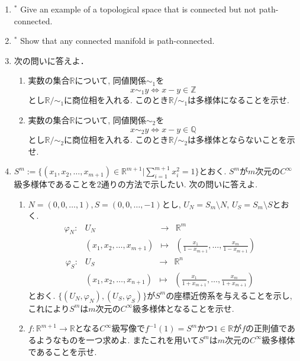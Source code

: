 \documentclass[dvipdfmx,a4paper,11pt]{article}
\newcommand{\R}{\mathbb{R}}
\newcommand{\Z}{\mathbb{Z}}
\newcommand{\Q}{\mathbb{Q}}
\theoremstyle{definition}
\begin{document}
\begin{enumerate}[label=\textbf{問}1.\arabic*]
	\item $^{*}$ Give an example of a topological space that is connected but not path-connected. %
	\item $^{*}$ Show that any connected manifold is path-connected. %
\item 次の問いに答えよ．
	\begin{enumerate}
	\item 実数の集合$\R$について, 同値関係$\sim_{1}$を
	$$
	x \sim_{1} y \Leftrightarrow x - y \in \Z
	$$
	とし$\R / \sim_{1}$に商位相を入れる. このとき$\R / \sim_{1}$は多様体になることを示せ.
	\item 実数の集合$\R$について, 同値関係$\sim_{2}$を
	$$
	x \sim_{2} y \Leftrightarrow x - y \in \Q
	$$
	とし$\R / \sim_{2}$に商位相を入れる.  このとき$\R / \sim_{2}$は多様体とならないことを示せ.
	\end{enumerate}
	
\item \label{sphere} $S^{m} := \{ (x_1, x_2, \ldots, x_{m+1}) \in \R^{m+1}| \sum_{i=1}^{m+1} x_{i}^{2} = 1 \}$とおく. $S^{m}$が$m$次元の$C^{\infty}$級多様体であることを2通りの方法で示したい. 次の問いに答えよ. 
	\begin{enumerate}
	\item $N=(0,0,\ldots, 1),S=(0,0,\ldots, -1)$とし, $U_{N} = S_{m} \setminus N$, $U_{S} = S_{m} \setminus S$とおく. 
$$
\begin{array}{ccccc}
\varphi_{N}: &U_{N}& \rightarrow & \R^{m} & \\
&(x_{1},x_{2}, \ldots ,x_{m+1})& \longmapsto &(\frac{x_{1}}{1-x_{m+1}}, \ldots, \frac{x_{m}}{1-x_{m+1}})&
\end{array}
$$	
$$
\begin{array}{ccccc}
\varphi_{S}: &U_{S}& \rightarrow & \R^{n} & \\
&(x_{1}, x_{2}, \ldots, x_{n+1})& \longmapsto &(\frac{x_1}{1 + x_{m+1}}, \ldots, \frac{x_m}{1+x_{m+1}})&
\end{array}
$$	
とおく. $\{(U_N, \varphi_N), (U_S, \varphi_S) \}$が$S^m$の座標近傍系を与えることを示し, これにより$S^{m}$は$m$次元の$C^{\infty}$級多様体となることを示せ.
	\item $f : \R^{m+1} \rightarrow \R$となる$C^{\infty}$級写像で$f^{-1}(1) = S^{m}$かつ$1 \in \R$が$f$の正則値であるようなものを一つ求めよ. またこれを用いて$S^{m}$は$m$次元の$C^{\infty}$級多様体であることを示せ. 
	\end{enumerate}


\end{enumerate}
\end{document}
